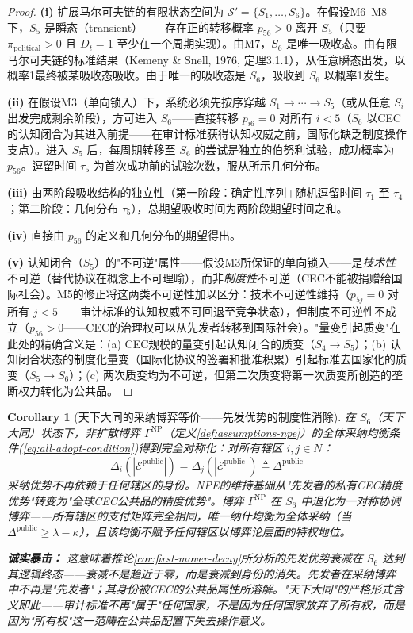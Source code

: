 \documentclass[12pt,a4paper]{ctexart}
\newtheorem{corollary}[theorem]{Corollary}
\theoremstyle{definition}
\theoremstyle{remark}
\begin{document}
\begin{proof}
\textbf{(i)} 扩展马尔可夫链的有限状态空间为 $\mathcal{S}' = \{S_1, \ldots, S_6\}$。在假设M6--M8下，$S_5$ 是瞬态（transient）——存在正的转移概率 $p_{56} > 0$ 离开 $S_5$（只要 $\pi_{\text{political}} > 0$ 且 $D_t = 1$ 至少在一个周期实现）。由M7，$S_6$ 是唯一吸收态。由有限马尔可夫链的标准结果（Kemeny \& Snell, 1976, 定理3.1.1），从任意瞬态出发，以概率1最终被某吸收态吸收。由于唯一的吸收态是 $S_6$，吸收到 $S_6$ 以概率1发生。

\textbf{(ii)} 在假设M3（单向锁入）下，系统必须先按序穿越 $S_1 \to \cdots \to S_5$（或从任意 $S_i$ 出发完成剩余阶段），方可进入 $S_6$——直接转移 $p_{i6} = 0$ 对所有 $i < 5$（$S_6$ 以CEC的认知闭合为其进入前提——在审计标准获得认知权威之前，国际化缺乏制度操作支点）。进入 $S_5$ 后，每周期转移至 $S_6$ 的尝试是独立的伯努利试验，成功概率为 $p_{56}$。逗留时间 $\tau_5$ 为首次成功前的试验次数，服从所示几何分布。

\textbf{(iii)} 由两阶段吸收结构的独立性（第一阶段：确定性序列+随机逗留时间 $\tau_1$ 至 $\tau_4$；第二阶段：几何分布 $\tau_5$），总期望吸收时间为两阶段期望时间之和。

\textbf{(iv)} 直接由 $p_{56}$ 的定义和几何分布的期望得出。

\textbf{(v)} 认知闭合（$S_5$）的"不可逆"属性——假设M3所保证的单向锁入——是\textit{技术性}不可逆（替代协议在概念上不可理喻），而非\textit{制度性}不可逆（CEC不能被捐赠给国际社会）。M5的修正将这两类不可逆性加以区分：技术不可逆性维持（$p_{5j} = 0$ 对所有 $j < 5$——审计标准的认知权威不可回退至竞争状态），但制度不可逆性不成立（$p_{56} > 0$——CEC的治理权可以从先发者转移到国际社会）。"量变引起质变"在此处的精确含义是：(a) CEC规模的量变引起认知闭合的质变（$S_4 \to S_5$）；(b) 认知闭合状态的制度化量变（国际化协议的签署和批准积累）引起标准去国家化的质变（$S_5 \to S_6$）；(c) 两次质变均为不可逆，但第二次质变将第一次质变所创造的垄断权力转化为公共品。
\end{proof}

\begin{corollary}[天下大同的采纳博弈等价——先发优势的制度性消除]
\label{cor:S6-adoption-equivalence}
在 $S_6$（天下大同）状态下，非扩散博弈 $\Gamma^{\text{NP}}$（定义\ref{def:assumptions-npe}）的全体采纳均衡条件(\ref{eq:all-adopt-condition})得到完全对称化：对所有辖区 $i, j \in N$：
\begin{equation}
\Delta_i(|\mathcal{E}^{\text{public}}|) = \Delta_j(|\mathcal{E}^{\text{public}}|) \triangleq \Delta^{\text{public}}
\end{equation}
采纳优势不再依赖于任何辖区的身份。NPE的维持基础从"先发者的私有CEC精度优势"转变为"全球CEC公共品的精度优势"。博弈 $\Gamma^{\text{NP}}$ 在 $S_6$ 中退化为一对称协调博弈——所有辖区的支付矩阵完全相同，唯一纳什均衡为全体采纳（当 $\Delta^{\text{public}} \geq \lambda - \kappa$），且该均衡不赋予任何辖区以博弈论层面的特权地位。

\textbf{诚实暴击：} 这意味着推论\ref{cor:first-mover-decay}所分析的先发优势衰减在 $S_6$ 达到其逻辑终态——衰减不是趋近于零，而是\textit{衰减到身份的消失}。先发者在采纳博弈中不再是"先发者"；其身份被CEC的公共品属性所溶解。"天下大同"的严格形式含义即此——审计标准不再"属于"任何国家，不是因为任何国家放弃了所有权，而是因为"所有权"这一范畴在公共品配置下失去操作意义。
\end{corollary}
\end{document}
